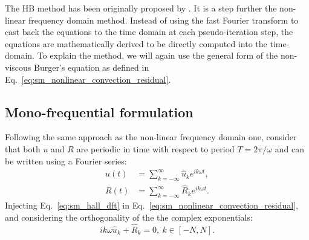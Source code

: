
The HB method has been originally
 proposed by \citet{Hall2002}.
It is a step further the non-linear frequency domain method. Instead
of using the fast Fourier transform to cast back the equations
to the time domain at each pseudo-iteration step, 
the equations are mathematically derived to be directly
computed into the time-domain.
To explain the method, we will again use the general form of 
the non-viscous Burger's equation as defined in
Eq.~\ref{eq:sm_nonlinear_convection_residual}.

\subsection{Mono-frequential formulation}

Following the same approach as the non-linear frequency domain one,
consider that both $u$ and $R$ are periodic
in time with respect to period $T = 2 \pi / \omega$
and can be written using a Fourier series:
\begin{equation}
	\begin{split}
		u(t) &= \sum_{k=-\infty}^{\infty} \widehat{u}_k e^{i k \omega t}, \\
		R(t) &= \sum_{k=-\infty}^{\infty} \widehat{R}_k e^{i k \omega t}.
		\label{eq:sm_hall_dft}
	\end{split}
\end{equation}
Injecting Eq.~\ref{eq:sm_hall_dft} in 
Eq.~\ref{eq:sm_nonlinear_convection_residual}, and considering
the orthogonality of the the complex exponentials:
\begin{equation}
	i k \omega \widehat{u}_k + \widehat{R}_k = 0, \: k \in [-N, N].
	\label{eq:sm_hall_frequential_eq}
\end{equation}

